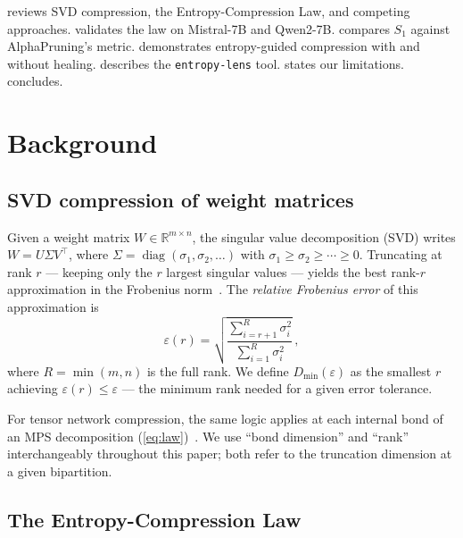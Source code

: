 \documentclass[11pt,a4paper]{article}
\newcommand{\Dmin}{D_{\min}}
\newcommand{\Svn}{S_1}
\begin{document}
 reviews SVD compression, the
Entropy-Compression Law, and competing approaches.
 validates the law on Mistral-7B and Qwen2-7B.
 compares $\Svn$ against AlphaPruning's
metric.
 demonstrates entropy-guided compression with
and without healing.
 describes the \texttt{entropy-lens} tool.
 states our limitations.
 concludes.


\section{Background}
\label{sec:background}

\subsection{SVD compression of weight matrices}
\label{sec:bg-svd}

Given a weight matrix $W \in \mathbb{R}^{m \times n}$, the singular
value decomposition (SVD) writes $W = U \Sigma V^\top$, where
$\Sigma = \operatorname{diag}(\sigma_1, \sigma_2, \ldots)$ with
$\sigma_1 \geq \sigma_2 \geq \cdots \geq 0$.  Truncating at rank
$r$ --- keeping only the $r$ largest singular values --- yields the
best rank-$r$ approximation in the Frobenius
norm~\citep{Eckart1936}.  The \emph{relative Frobenius error} of
this approximation is
\begin{equation}
  \label{eq:frob-error}
  \varepsilon(r) = \sqrt{\frac{\sum_{i=r+1}^{R} \sigma_i^2}
                              {\sum_{i=1}^{R} \sigma_i^2}}\,,
\end{equation}
where $R = \min(m, n)$ is the full rank.  We define $\Dmin(\varepsilon)$
as the smallest $r$ achieving $\varepsilon(r) \leq \varepsilon$ ---
the minimum rank needed for a given error tolerance.

For tensor network compression, the same logic applies at each
internal bond of an MPS decomposition
(\cref{eq:law})~\citep{Oseledets2011, Schollwock2011}.  We use
``bond dimension'' and ``rank'' interchangeably throughout this
paper; both refer to the truncation dimension at a given bipartition.

\subsection{The Entropy-Compression Law}
\label{sec:bg-law}
\end{document}
